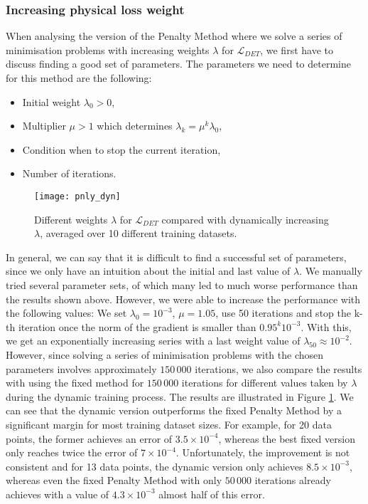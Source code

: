 \subsubsection{Increasing physical loss weight}
When analysing the version of the Penalty Method where we solve a series of minimisation problems with increasing weights $\lambda$ for $\mathcal{L}_{DET}$, we first have to discuss finding a good set of parameters. The parameters we need to determine for this method are the following:
\begin{itemize}
	\item Initial weight $\lambda_0 > 0$,
	\item Multiplier $\mu > 1$ which determines $\lambda_k = \mu^k\lambda_0$,
	\item Condition when to stop the current iteration,
	\item Number of iterations.
\end{itemize}
\begin{figure}[H]
	\centering
	\texttt{[image: pnly\_dyn]}
	\caption{Different weights $\lambda$ for $\mathcal{L}_{DET}$ compared with dynamically increasing $\lambda$, averaged over 10 different training datasets.}
	\label{fig:pnly_dyn}
\end{figure}
In general, we can say that it is difficult to find a successful set of parameters, since we only have an intuition about the initial and last value of $\lambda$. We manually tried several parameter sets, of which many led to much worse performance than the results shown above. However, we were able to increase the performance with the following values: We set $\lambda_0 = 10^{-3}$, $\mu = 1.05$, use 50 iterations and stop the k-th iteration once the norm of the gradient is smaller than $0.95^{k} 10^{-3}$. With this, we get an exponentially increasing series with a last weight value of $\lambda_{50} \approx 10^{-2}$. However, since solving a series of minimisation problems with the chosen parameters involves approximately $150\,000$ iterations, we also compare the results with using the fixed method for $150\,000$ iterations for different values taken by $\lambda$ during the dynamic training process. The results are illustrated in Figure \ref{fig:pnly_dyn}. We can see that the dynamic version outperforms the fixed Penalty Method by a significant margin for most training dataset sizes. For example, for 20 data points, the former achieves an error of $3.5\times 10^{-4}$, whereas the best fixed version only reaches twice the error of $7\times 10^{-4}$. Unfortunately, the improvement is not consistent and for 13 data points, the dynamic version only achieves $8.5 \times 10^{-3}$, whereas even the fixed Penalty Method with only $50\,000$ iterations already achieves with a value of $4.3 \times 10^{-3}$ almost half of this error.\\
